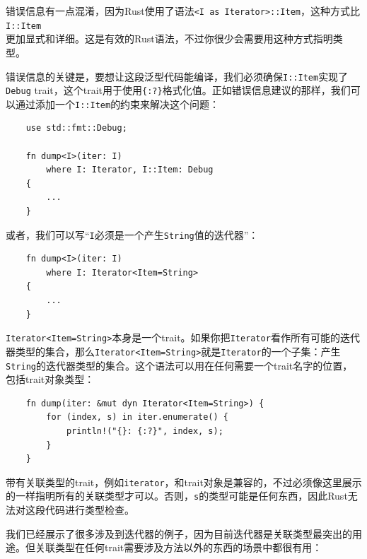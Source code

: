 错误信息有一点混淆，因为Rust使用了语法\texttt{<I as Iterator>::Item}，这种方式比\texttt{I::Item}\\
更加显式和详细。这是有效的Rust语法，不过你很少会需要用这种方式指明类型。

错误信息的关键是，要想让这段泛型代码能编译，我们必须确保\texttt{I::Item}实现了\texttt{Debug} trait，这个trait用于使用\texttt{\{:?\}}格式化值。正如错误信息建议的那样，我们可以通过添加一个\texttt{I::Item}的约束来解决这个问题：
\begin{verbatim}
    use std::fmt::Debug;

    fn dump<I>(iter: I)
        where I: Iterator, I::Item: Debug
    {
        ...
    }
\end{verbatim}

或者，我们可以写“\texttt{I}必须是一个产生\texttt{String}值的迭代器”：
\begin{verbatim}
    fn dump<I>(iter: I)
        where I: Iterator<Item=String>
    {
        ...
    }
\end{verbatim}

\texttt{Iterator<Item=String>}本身是一个trait。如果你把\texttt{Iterator}看作所有可能的迭代器类型的集合，那么\texttt{Iterator<Item=String>}就是\texttt{Iterator}的一个子集：产生\texttt{String}的迭代器类型的集合。这个语法可以用在任何需要一个trait名字的位置，包括trait对象类型：
\begin{verbatim}
    fn dump(iter: &mut dyn Iterator<Item=String>) {
        for (index, s) in iter.enumerate() {
            println!("{}: {:?}", index, s);
        }
    }
\end{verbatim}

带有关联类型的trait，例如\texttt{iterator}，和trait对象是兼容的，不过必须像这里展示的一样指明所有的关联类型才可以。否则，\texttt{s}的类型可能是任何东西，因此Rust无法对这段代码进行类型检查。

我们已经展示了很多涉及到迭代器的例子，因为目前迭代器是关联类型最突出的用途。但关联类型在任何trait需要涉及方法以外的东西的场景中都很有用：

